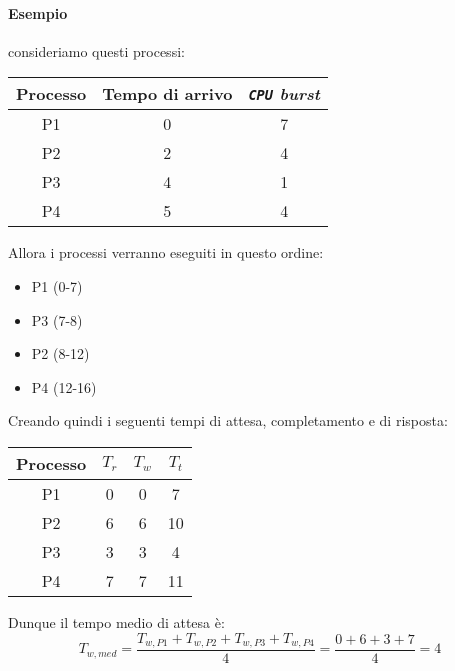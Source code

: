             \paragraph{Esempio} consideriamo questi processi:
            \begin{table}[H]
                \centering
                \begin{tabular}{|c|c|c|}
                    \hline
                    \textbf{Processo} & \textbf{Tempo di arrivo} & \textbf{\textit{\texttt{CPU} burst}} \\ \hline
                    P1 & 0 & 7 \\ \hline
                    P2 & 2 & 4 \\ \hline
                    P3 & 4 & 1 \\ \hline
                    P4 & 5 & 4 \\ \hline
                    \end{tabular}
            \end{table}
            Allora i processi verranno eseguiti in questo ordine:
            \begin{itemize}
                \item P1 (0-7)
                \item P3 (7-8)
                \item P2 (8-12)
                \item P4 (12-16)
            \end{itemize}
            Creando quindi i seguenti tempi di attesa, completamento e di risposta:
            \begin{table}[H]
                \centering
                \begin{tabular}{|c|c|c|c|}
                    \hline
                    \textbf{Processo} & \textbf{$T_r$} & \textbf{$T_w$} & \textbf{$T_t$} \\ \hline
                    P1 & 0 & 0 & 7 \\ \hline
                    P2 & 6 & 6 & 10 \\ \hline
                    P3 & 3 & 3 & 4 \\ \hline
                    P4 & 7 & 7 & 11 \\ \hline
                \end{tabular}
            \end{table}
            Dunque il tempo medio di attesa è:
            $$
                T_{w,med} = \frac{T_{w,P1} + T_{w,P2} + T_{w,P3} + T_{w,P4}}{4} = \frac{0 + 6 + 3 + 7}{4} = 4
            $$
